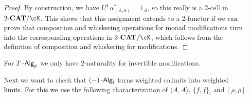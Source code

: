 \documentclass[a4paper,11pt,oneside,openany]{scrbook}
\begin{document}
\begin{proof}
    By construction, we have $U^L\alpha^*_{(A,a)}=1_A$, so this really is a
    2-cell in $2\mbox{-}\CAT/\cK$. This shows that this assignment extends to a
    2-functor if we can prove that composition and whiskering operations for
    monad modifications turn into the corresponding operations in $2\mbox{-}\CAT/\cK$,
    which follows from the definition of composition and whiskering for
    modifications.
\end{proof}

\begin{rmk}
    For $T\operatorname{-\mathsf{Alg}}_p$ we only have 2-naturality for invertible modifications.
\end{rmk}

Next we want to check that $(-)\operatorname{-\mathsf{Alg}}_l$ turns weighted colimits into weighted
limits. For this we use the following characterization of $\langle A,A\rangle$, $\{f,f\}_l$
and $[\rho,\rho]$.
\end{document}
